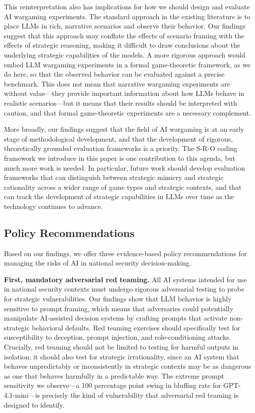 \documentclass[12pt]{article}
\theoremstyle{plain}
\theoremstyle{definition}
\begin{document}
This reinterpretation also has implications for how we should design and evaluate AI wargaming experiments. The standard approach in the existing literature is to place LLMs in rich, narrative scenarios and observe their behavior. Our findings suggest that this approach may conflate the effects of scenario framing with the effects of strategic reasoning, making it difficult to draw conclusions about the underlying strategic capabilities of the models. A more rigorous approach would embed LLM wargaming experiments in a formal game-theoretic framework, as we do here, so that the observed behavior can be evaluated against a precise benchmark. This does not mean that narrative wargaming experiments are without value---they provide important information about how LLMs behave in realistic scenarios---but it means that their results should be interpreted with caution, and that formal game-theoretic experiments are a necessary complement.

More broadly, our findings suggest that the field of AI wargaming is at an early stage of methodological development, and that the development of rigorous, theoretically grounded evaluation frameworks is a priority. The S-R-O coding framework we introduce in this paper is one contribution to this agenda, but much more work is needed. In particular, future work should develop evaluation frameworks that can distinguish between strategic mimicry and strategic rationality across a wider range of game types and strategic contexts, and that can track the development of strategic capabilities in LLMs over time as the technology continues to advance.

\subsection{Policy Recommendations}

Based on our findings, we offer three evidence-based policy recommendations for managing the risks of AI in national security decision-making.

\textbf{First, mandatory adversarial red teaming.} All AI systems intended for use in national security contexts must undergo rigorous adversarial testing to probe for strategic vulnerabilities. Our findings show that LLM behavior is highly sensitive to prompt framing, which means that adversaries could potentially manipulate AI-assisted decision systems by crafting prompts that activate non-strategic behavioral defaults. Red teaming exercises should specifically test for susceptibility to deception, prompt injection, and role-conditioning attacks. Crucially, red teaming should not be limited to testing for harmful outputs in isolation; it should also test for strategic irrationality, since an AI system that behaves unpredictably or inconsistently in strategic contexts may be as dangerous as one that behaves harmfully in a predictable way. The extreme prompt sensitivity we observe---a 100 percentage point swing in bluffing rate for GPT-4.1-mini---is precisely the kind of vulnerability that adversarial red teaming is designed to identify.
\end{document}
